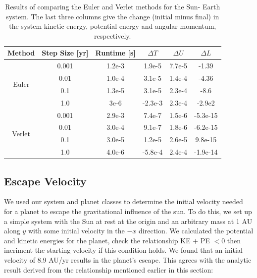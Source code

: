 \documentclass[10pt,showpacs,preprintnumbers,footinbib,amsmath,amssymb,aps,prl,twocolumn,groupedaddress,superscriptaddress,showkeys]{revtex4-1}
\begin{document}
\begin{table}
\centering
	\begin{tabular}{ c | c c | c c c }
	Method & Step Size [yr] & Runtime [s] & $\Delta T$ & $\Delta U$ & $\Delta L$\\
\hline
	\multirow{4}{*}{Euler} & 0.001 & 1.2e-3 & 1.9e-5 & 7.7e-5 & -1.39\\
	                                     & 0.01   & 1.0e-4  & 3.1e-5 & 1.4e-4 & -4.36\\
	                                     & 0.1     & 1.3e-5  & 3.1e-5 & 2.3e-4 & -8.6\\
	                                      & 1.0     & 3e-6    & -2.3e-3 & 2.3e-4 & -2.9e2\\
\hline
	\multirow{4}{*}{Verlet} & 0.001 & 2.9e-3 & 7.4e-7 & 1.5e-6 & -5.3e-15 \\
	                                       & 0.01   & 3.0e-4 & 9.1e-7 & 1.8e-6 & -6.2e-15\\
	                                       & 0.1     & 3.0e-5 & 1.2e-5 & 2.6e-5 & 9.8e-15\\
	                                       & 1.0     & 4.0e-6 & -5.8e-4 & 2.4e-4 & -1.9e-14\\
\hline
	\end{tabular}
	\caption{Results of comparing the Euler and Verlet methods for the Sun-
	Earth system. The last three columns give the change (initial minus final)
	in the system kinetic energy, potential energy and angular momentum,
	respectively.}
	\label{tab:EVresults}
\end{table}



\subsection*{Escape Velocity}

We used our system and planet classes to determine the initial velocity needed
for a planet to escape the gravitational influence of the sun. To do this, we set
up a simple system with the Sun at rest at the origin and an arbitrary mass at 1
AU along $y$ with some initial velocity in the $-x$ direction. We calculated the
potential and kinetic energies for the planet, check the relationship KE $+$ PE
$< 0$ then incriment the starting velocity if this condition holds. We found that
an initial velocity of 8.9 AU/yr results in the planet's escape. This agrees with
the analytic result derived from the relationship mentioned earlier in this section:
\end{document}
